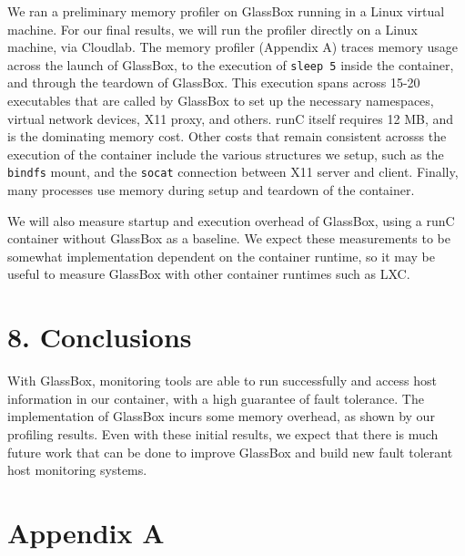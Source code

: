 \documentclass{proc}
\begin{document}
We ran a preliminary memory profiler on GlassBox running in a Linux virtual machine. For our final results, we will run the profiler directly on a Linux machine, via Cloudlab. The memory profiler (Appendix A) traces memory usage across the launch of GlassBox, to the execution of \texttt{sleep 5} inside the container, and through the teardown of GlassBox. This execution spans across 15-20 executables that are called by GlassBox to set up the necessary namespaces, virtual network devices, X11 proxy, and others. runC itself requires 12 MB, and is the dominating memory cost. Other costs that remain consistent acrosss the execution of the container include the various structures we setup, such as the \texttt{bindfs} mount, and the \texttt{socat} connection between X11 server and client. Finally, many processes use memory during setup and teardown of the container.

We will also measure startup and execution overhead of GlassBox, using a runC container without GlassBox as a baseline. We expect these measurements to be somewhat implementation dependent on the container runtime, so it may be useful to measure GlassBox with other container runtimes such as LXC.

\section*{8. Conclusions}

With GlassBox, monitoring tools are able to run successfully and access host information in our container, with a high guarantee of fault tolerance. The implementation of GlassBox incurs some memory overhead, as shown by our profiling results. Even with these initial results, we expect that there is much future work that can be done to improve GlassBox and build new fault tolerant host monitoring systems.




\clearpage

\section*{Appendix A}

\end{document}
